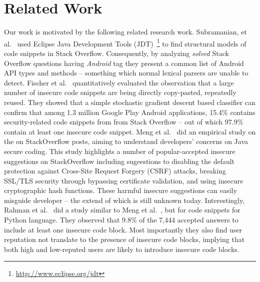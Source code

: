 \section{Related Work}
\label{sec:related-work}
Our work is motivated by the following related research work. 
Subramanian, et al.~\cite{subramanian2013making} used Eclipse Java Development Tools (JDT)~\footnote{\url{http://www.eclipse.org/jdt}}  
to find structural models of code snippets in Stack Overflow. Consequently, by analyzing \textit{solved} Stack Overflow questions having \textit{Android} 
tag they present a common list of Android API types and methods -- something which normal lexical parsers are unable to detect. 
Fischer et al.~\cite{fischer2017stack}  quantitatively evaluated the observation that a large number of insecure code snippets are being directly copy-pasted, 
repeatedly reused. They showed that a simple stochastic gradient descent based classifier can confirm that among 1.3 million Google Play Android applications, 
15.4\% contains security-related code snippets from  from Stack Overflow -- out of which 97.9\% contain at least one insecure code snippet. 
Meng et al.~\cite{meng2018secure} did an empirical study on the on StackOverflow posts, aiming to understand developers’ concerns on Java secure coding. 
This study highlights a number of popular-accepted insecure suggestions on  StackOverflow including sugeestions to disabling the default protection 
against Cross-Site Request Forgery (CSRF) attacks, breaking SSL/TLS security through bypassing certificate validation, and using insecure cryptographic 
hash functions. These harmful insecure suggestions can easily misguide developer -- the extend of which is still unknown today. 
Interestingly, Rahman et al.~\cite{akondsnakes} did a study similar to Meng et al.~\cite{meng2018secure}, but for code snippets for Python language. 
They observed that 9.8\% of the 7,444 accepted answers to include at least one insecure code block. Most importantly they also find user reputation not
translate to the presence of insecure code blocks, implying  that both high and low-reputed users are likely to introduce insecure code blocks. 


